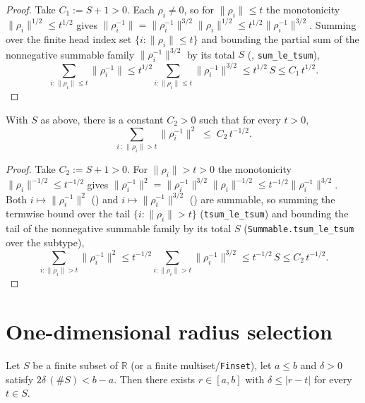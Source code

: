 \begin{proof}
\leanok
{}
Take $C_1:=S+1>0$. Each $\rho_i\neq0$, so for $\|\rho_i\|\le t$ the monotonicity
$\|\rho_i\|^{1/2}\le t^{1/2}$ gives
$\|\rho_i^{-1}\|=\|\rho_i^{-1}\|^{3/2}\|\rho_i\|^{1/2}\le t^{1/2}\|\rho_i^{-1}\|^{3/2}$. Summing
over the finite head index set $\{i:\|\rho_i\|\le t\}$ and bounding the partial sum of the
nonnegative summable family $\|\rho_i^{-1}\|^{3/2}$ by its total $S$ (,
\texttt{sum\_le\_tsum}),
\[
  \sum_{i:\|\rho_i\|\le t}\|\rho_i^{-1}\|\le t^{1/2}\sum_{i:\|\rho_i\|\le t}\|\rho_i^{-1}\|^{3/2}
   \le t^{1/2}\,S\le C_1\,t^{1/2}.
\]
\end{proof}

\begin{lemma}
\label{lem:cm_sum_inv_sq_tail}
\leanok
{}
With $S$ as above, there is a constant $C_2>0$ such that for every $t>0$,
\[
  \sum_{i\,:\,\|\rho_i\|> t}\|\rho_i^{-1}\|^{2}\;\le\;C_2\,t^{-1/2}.
\]
\end{lemma}

\begin{proof}
\leanok
{}
Take $C_2:=S+1>0$. For $\|\rho_i\|>t>0$ the monotonicity $\|\rho_i\|^{-1/2}\le t^{-1/2}$ gives
$\|\rho_i^{-1}\|^{2}=\|\rho_i^{-1}\|^{3/2}\|\rho_i\|^{-1/2}\le t^{-1/2}\|\rho_i^{-1}\|^{3/2}$. Both
$i\mapsto\|\rho_i^{-1}\|^{2}$ () and $i\mapsto\|\rho_i^{-1}\|^{3/2}$
() are summable, so summing the termwise bound over the tail
$\{i:\|\rho_i\|>t\}$ (\texttt{tsum\_le\_tsum}) and bounding the tail of the nonnegative summable
family by its total $S$ (\texttt{Summable.tsum\_le\_tsum} over the subtype),
\[
  \sum_{i:\|\rho_i\|>t}\|\rho_i^{-1}\|^{2}\le t^{-1/2}\sum_{i:\|\rho_i\|>t}\|\rho_i^{-1}\|^{3/2}
   \le t^{-1/2}\,S\le C_2\,t^{-1/2}.
\]
\end{proof}

\section{One-dimensional radius selection}
\label{sec:cm_radius}

\begin{lemma}
\label{lem:cm_radial_select}
\leanok
Let $S$ be a finite subset of $\mathbb R$ (or a finite multiset/\texttt{Finset}), let
$a\le b$ and $\delta>0$ satisfy $2\delta\,(\#S)<b-a$. Then there exists $r\in[a,b]$ with
$\delta\le|r-t|$ for every $t\in S$.
\end{lemma}

